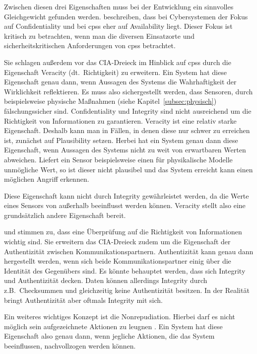 \documentclass[final,bibliography=totocnumbered]{include/sikseminar}
\newcommand{\cps}{\glspl{cps}\xspace}
\begin{document}
Zwischen diesen drei Eigenschaften muss bei der Entwicklung ein sinnvolles Gleichgewicht gefunden werden.
\citeauthor{GK16} beschreiben, dass bei Cybersystemen der Fokus auf Confidentiality und bei \cps eher auf Availability liegt.
Dieser Fokus ist kritisch zu betrachten, wenn man die diversen Einsatzorte und sicherheitskritischen Anforderungen von \cps betrachtet.

Sie schlagen außerdem vor das CIA-Dreieck im Hinblick auf \cps durch die Eigenschaft Veracity (dt.~Richtigkeit) zu erweitern.
Ein System hat diese Eigenschaft genau dann, wenn Aussagen des Systems die Wahrhaftigkeit der  Wirklichkeit reflektieren.
Es muss also sichergestellt werden, dass Sensoren, durch beispielsweise physische Maßnahmen (siehe Kapitel~\ref{subsec:physisch}) fälschungssicher sind.
Confidentiality und Integrity sind nicht ausreichend um die Richtigkeit von Informationen zu garantieren.
Veracity ist eine relativ starke Eigenschaft.
Deshalb kann man in Fällen, in denen diese nur schwer zu erreichen ist, zunächst auf Plausibility setzen.
Herbei hat ein System genau dann diese Eigenschaft, wenn Aussagen des Systems nicht zu weit von erwartbaren Werten abweichen.
Liefert ein Sensor beispielsweise einen für physikalische Modelle unmögliche Wert, so ist dieser nicht plausibel und das System erreicht kann einen möglichen Angriff erkennen.~\cite{GK16}

Diese Eigenschaft kann nicht durch Integrity gewährleistet werden, da die Werte eines Sensors von außerhalb beeinflusst werden können.
Veracity stellt also eine grundsätzlich andere Eigenschaft bereit.

\citeauthor{WYX+10} und \citeauthor{SFJ17} stimmen zu, dass eine Überprüfung auf die Richtigkeit von Informationen wichtig sind.
Sie erweitern das CIA-Dreieck zudem um die Eigenschaft der Authentizität zwischen Kommunikationspartnern.
Authentizität kann genau dann hergestellt werden, wenn sich beide Kommunikationspartner einig über die Identität des Gegenübers sind.
Es könnte behauptet werden, dass sich Integrity und Authentizität decken.
Daten können allerdings Integrity durch z.B.\ Checksummen und gleichzeitig keine Authentizität besitzen.
In der Realität bringt Authentizität aber oftmals Integrity mit sich.

Ein weiteres wichtiges Konzept ist die Nonrepudiation. %
Hierbei darf es nicht möglich sein aufgezeichnete Aktionen zu leugnen \cite{NIST13}.
Ein System hat diese Eigenschaft also genau dann, wenn jegliche Aktionen, die das System beeinflussen, nachvollzogen werden können. \label{def:nonrepudiation}
\end{document}
